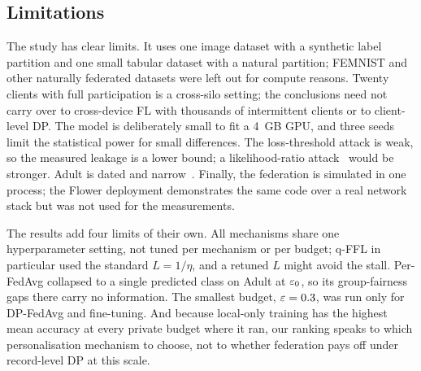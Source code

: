 \subsection{Limitations}
The study has clear limits. It uses one image dataset with a synthetic label partition and one small tabular
dataset with a natural partition; FEMNIST and other naturally federated datasets were left out for compute reasons.
Twenty clients with full participation is a cross-silo setting; the conclusions need not carry over to cross-device
FL with thousands of intermittent clients or to client-level DP. The model is deliberately small to fit a 4~GB GPU,
and three seeds limit the statistical power for small differences. The loss-threshold attack is weak, so the
measured leakage is a lower bound; a likelihood-ratio attack~\cite{carlini2022membership} would be stronger. Adult
is dated and narrow~\cite{ding2021retiring}. Finally, the federation is simulated in one process; the Flower
deployment demonstrates the same code over a real network stack but was not used for the measurements.

The results add four limits of their own. All mechanisms share one hyperparameter setting, not tuned per mechanism or
per budget; q-FFL in particular used the standard $L=1/\eta$, and a retuned $L$ might avoid the stall. Per-FedAvg
collapsed to a single predicted class on Adult at $\varepsilon_0$, so its group-fairness gaps there carry no information.
The smallest budget, $\varepsilon=0.3$, was run only for DP-FedAvg and fine-tuning. And because local-only training has the highest
mean accuracy at every private budget where it ran, our ranking speaks to which personalisation mechanism to choose,
not to whether federation pays off under record-level DP at this scale.
